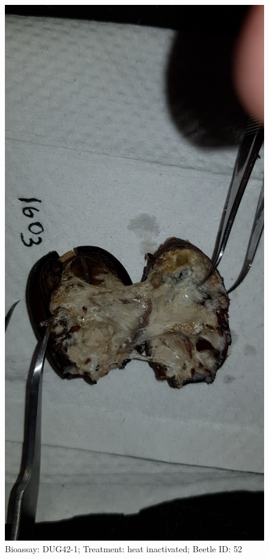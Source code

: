 \documentclass[11pt]{scrartcl}
\begin{document}
\begin{figure}[h!]
    \centering
    \includegraphics[width=\linewidth, height=\textheight, keepaspectratio]{uploads/btl.pm_image.b9ef3c9106e2af10.447567343220313630335f5265702d3120284849292e6a7067.jpg}
    \caption{Bioassay: DUG42-1; Treatment: heat inactivated; Beetle ID: 52}
\end{figure}
\clearpage
\end{document}
